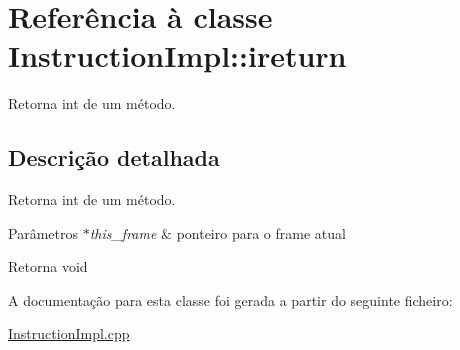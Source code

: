 \hypertarget{class_instruction_impl_1_1ireturn}{}\section{Referência à classe Instruction\+Impl\+:\+:ireturn}
\label{class_instruction_impl_1_1ireturn}


Retorna int de um método.  




\subsection{Descrição detalhada}
Retorna int de um método. 


\begin{DoxyParams}{Parâmetros}
{\em $\ast$this\+\_\+frame} & ponteiro para o frame atual \\
\hline
\end{DoxyParams}
\begin{DoxyReturn}{Retorna}
void 
\end{DoxyReturn}


A documentação para esta classe foi gerada a partir do seguinte ficheiro\+:\begin{DoxyCompactItemize}
\item 
\hyperlink{_instruction_impl_8cpp}{Instruction\+Impl.\+cpp}\end{DoxyCompactItemize}
